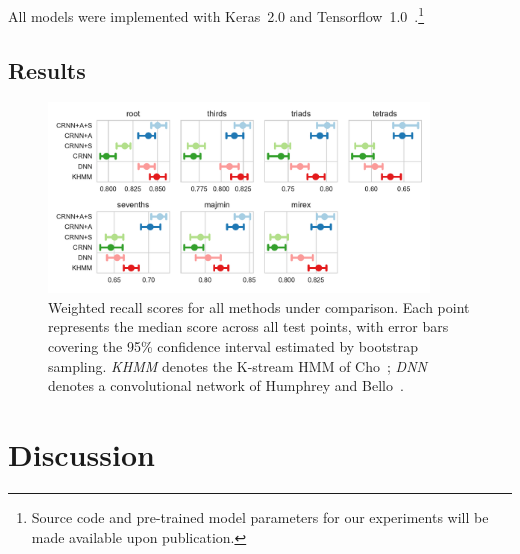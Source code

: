 \documentclass{article}
\begin{document}

All models were implemented with Keras~2.0 and Tensorflow~1.0~\cite{chollet2015keras, tensorflow2015-whitepaper}.\footnote{Source code and pre-trained model parameters for our experiments will be made available upon publication.}

\subsection{Results}

\begin{figure}[t]
    \centering
    \includegraphics[width=0.9\textwidth]{crnn-scores}
    \caption{Weighted recall scores for all methods under comparison.  Each point represents the median score across all test points, with error bars covering the 95\% confidence interval estimated by bootstrap sampling.
        \emph{KHMM} denotes the K-stream HMM of Cho~\cite{cho2014improved}; \emph{DNN} denotes a convolutional network of Humphrey and Bello~\cite{humphrey2015four}.\label{fig:results}}
\end{figure}
\section{Discussion}




\end{document}
